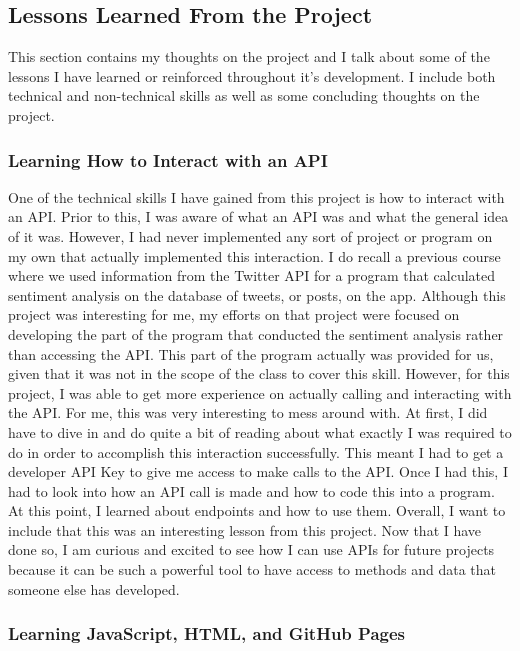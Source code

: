 \documentclass{article}
\theoremstyle{theorem}
\theoremstyle{definition}
\theoremstyle{remark}
\begin{document}
\subsection{Lessons Learned From the Project} 

This section contains my thoughts on the project and I talk about some of the lessons I have learned or reinforced throughout it's development. I include both technical and non-technical skills as well as some concluding thoughts on the project. \\
 
\subsubsection{Learning How to Interact with an API}

One of the technical skills I have gained from this project is how to interact with an API. Prior to this, I was aware of what an API was and what the general idea of it was. However, I had never implemented any sort of project or program on my own that actually implemented this interaction. I do recall 
a previous course where we used information from the Twitter API for a program that calculated sentiment analysis on the database of tweets, or posts, on the app. Although this project was interesting for me, my efforts on that project were focused on developing the part of the program that conducted the 
sentiment analysis rather than accessing the API. This part of the program actually was provided for us, given that it was not in the scope of the class to cover this skill. However, for this project, I was able to get more experience on actually calling and interacting with the API. For me, this was very 
interesting to mess around with. At first, I did have to dive in and do quite a bit of reading about what exactly I was required to do in order to accomplish this interaction successfully. This meant I had to get a developer API Key to give me access to make calls to the API. Once I had this, I had to look into 
how an API call is made and how to code this into a program. At this point, I learned about endpoints and how to use them. Overall, I want to include that this was an interesting lesson from this project. Now that I have done so, I am curious and excited to see how I can use APIs for future projects because 
it can be such a powerful tool to have access to methods and data that someone else has developed. \\

\subsubsection{Learning JavaScript, HTML, and GitHub Pages}
\end{document}
